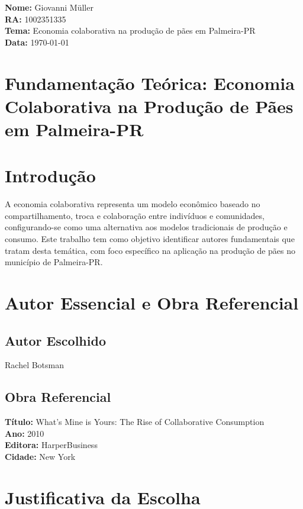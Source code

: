 \documentclass[12pt, a4paper]{article}
\begin{document}
\begin{flushleft}
\textbf{Nome:} Giovanni Müller \\
\textbf{RA:} 1002351335 \\
\textbf{Tema:} Economia colaborativa na produção de pães em Palmeira-PR \\
\textbf{Data:} \today \\
\end{flushleft}

\section*{\centering Fundamentação Teórica: Economia Colaborativa na Produção de Pães em Palmeira-PR}

\justifying

\section{Introdução}

A economia colaborativa representa um modelo econômico baseado no compartilhamento, troca e colaboração entre indivíduos e comunidades, configurando-se como uma alternativa aos modelos tradicionais de produção e consumo. Este trabalho tem como objetivo identificar autores fundamentais que tratam desta temática, com foco específico na aplicação na produção de pães no município de Palmeira-PR.

\section{Autor Essencial e Obra Referencial}

\subsection*{Autor Escolhido}
Rachel Botsman

\subsection*{Obra Referencial}
\textbf{Título:} What's Mine is Yours: The Rise of Collaborative Consumption \\
\textbf{Ano:} 2010 \\
\textbf{Editora:} HarperBusiness \\
\textbf{Cidade:} New York

\section{Justificativa da Escolha}
\end{document}
